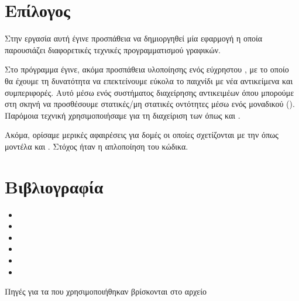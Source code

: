 \documentclass[11pt]{scrartcl} %
\begin{document}
\section{Επίλογος}

Στην εργασία αυτή έγινε προσπάθεια να δημιοργηθεί μία εφαρμογή 
η οποία παρουσιάζει διαφορετικές τεχνικές προγραμματισμού γραφικών. 

Στο πρόγραμμα έγινε, ακόμα προσπάθεια υλοποίησης ενός εύχρηστου , με το
οποίο θα έχουμε τη δυνατότητα να επεκτείνουμε εύκολα το παιχνίδι με νέα
αντικείμενα και συμπεριφορές. Αυτό μέσω ενός συστήματος διαχείρησης αντικειμέων
όπου μπορούμε στη σκηνή να προσθέσουμε στατικές/μη στατικές οντότητες μέσω ενός
μοναδικού  (). Παρόμοια τεχνική
χρησιμοποιήσαμε για τη διαχείριση των  όπως  και
.

Ακόμα, ορίσαμε μερικές αφαιρέσεις για δομές οι οποίες σχετίζονται με
την  όπως μοντέλα και . 
Στόχος ήταν η απλοποίηση του κώδικα.

\section{Βιβλιογραφία}
\small
\begin{itemize}
    \item {}
    \item {}
    \item {}
    \item {}
    \item {}
    \item {}
\end{itemize}
    Πηγές για τα  που χρησιμοποιήθηκαν βρίσκονται στο αρχείο 
\end{document}
